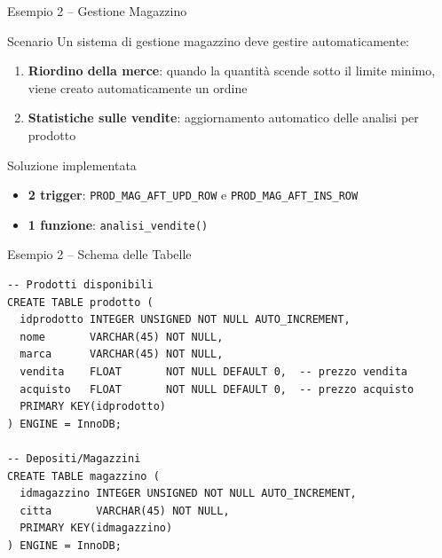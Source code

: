 \documentclass[aspectratio=169]{beamer}
\begin{document}
\begin{frame}{Esempio 2 -- Gestione Magazzino}
  \begin{block}{Scenario}
    Un sistema di gestione magazzino deve gestire automaticamente:
    \begin{enumerate}
      \item \textbf{Riordino della merce}: quando la quantità scende sotto
            il limite minimo, viene creato automaticamente un ordine
      \item \textbf{Statistiche sulle vendite}: aggiornamento automatico
            delle analisi per prodotto
    \end{enumerate}
  \end{block}
  \vspace{0.2cm}
  \begin{alertblock}{Soluzione implementata}
    \begin{itemize}
      \item \textbf{2 trigger}: \texttt{PROD\_MAG\_AFT\_UPD\_ROW} e
            \texttt{PROD\_MAG\_AFT\_INS\_ROW}
      \item \textbf{1 funzione}: \texttt{analisi\_vendite()}
    \end{itemize}
  \end{alertblock}
\end{frame}

\begin{frame}[fragile]{Esempio 2 -- Schema delle Tabelle}
  \begin{lstlisting}[style=sqlstyle]
-- Prodotti disponibili
CREATE TABLE prodotto (
  idprodotto INTEGER UNSIGNED NOT NULL AUTO_INCREMENT,
  nome       VARCHAR(45) NOT NULL,
  marca      VARCHAR(45) NOT NULL,
  vendita    FLOAT       NOT NULL DEFAULT 0,  -- prezzo vendita
  acquisto   FLOAT       NOT NULL DEFAULT 0,  -- prezzo acquisto
  PRIMARY KEY(idprodotto)
) ENGINE = InnoDB;

-- Depositi/Magazzini
CREATE TABLE magazzino (
  idmagazzino INTEGER UNSIGNED NOT NULL AUTO_INCREMENT,
  citta       VARCHAR(45) NOT NULL,
  PRIMARY KEY(idmagazzino)
) ENGINE = InnoDB;
  \end{lstlisting}
\end{frame}
\end{document}
